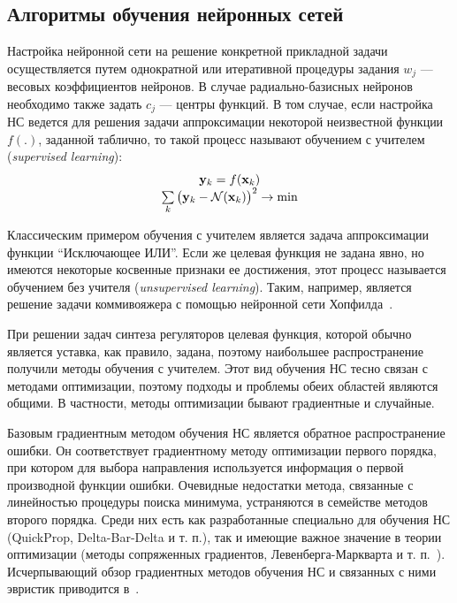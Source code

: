 

\subsection{Алгоритмы обучения нейронных сетей}\label{nn_learning_algorithms}

Настройка нейронной сети на решение конкретной прикладной задачи
осуществляется путем однократной или итеративной процедуры задания
$w_j$ --- весовых коэффициентов нейронов.  В случае радиально-базисных
нейронов необходимо также задать $c_j$ --- центры функций.  В том
случае, если настройка НС ведется для решения задачи аппроксимации
некоторой неизвестной функции $f(.)$, заданной таблично, то такой
процесс называют обучением с учителем ({\em supervised learning}):
\begin{equation}\label{eq:supervised_learning_task}
  \begin{array}{c}
    \mathbf{y}_k=f(\mathbf{x}_k)\\
    \sum\limits_k\big(\mathbf{y}_k-\NN(\mathbf{x}_k)\big)^2\rightarrow\min
  \end{array}
\end{equation}

Классическим примером обучения с учителем является задача
аппроксимации функции ``Исключающее ИЛИ''.  Если же целевая функция не
задана явно, но имеются некоторые косвенные признаки ее достижения,
этот процесс называется обучением без учителя ({\em unsupervised
  learning}).  Таким, например, является решение задачи коммивояжера с
помощью нейронной сети Хопфилда~\cite{wasser92}.

При решении задач синтеза регуляторов целевая функция, которой обычно
является уставка, как правило, задана, поэтому наибольшее
распространение получили методы обучения с учителем.  Этот вид
обучения НС тесно связан с методами оптимизации, поэтому подходы и
проблемы обеих областей являются общими.  В частности, методы
оптимизации бывают градиентные и случайные.

Базовым градиентным методом обучения НС является обратное
распространение ошибки.  Он соответствует градиентному методу
оптимизации первого порядка, при котором для выбора направления
используется информация о первой производной функции ошибки.
Очевидные недостатки метода, связанные с линейностью процедуры поиска
минимума, устраняются в семействе методов второго порядка.  Среди них
есть как разработанные специально для обучения НС (QuickProp,
Delta-Bar-Delta и т. п.), так и имеющие важное значение в теории
оптимизации (методы сопряженных градиентов, Левенберга-Маркварта и
т. п.~\cite{himmelblau75}).  Исчерпывающий обзор градиентных методов
обучения НС и связанных с ними эвристик приводится в~\cite{gibb96}.

